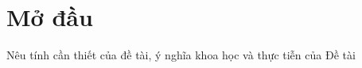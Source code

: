\chapter*{Mở đầu}
\makeatletter
\makeatother

Nêu tính cần thiết của đề tài, ý nghĩa khoa học và thực tiễn của Đề tài